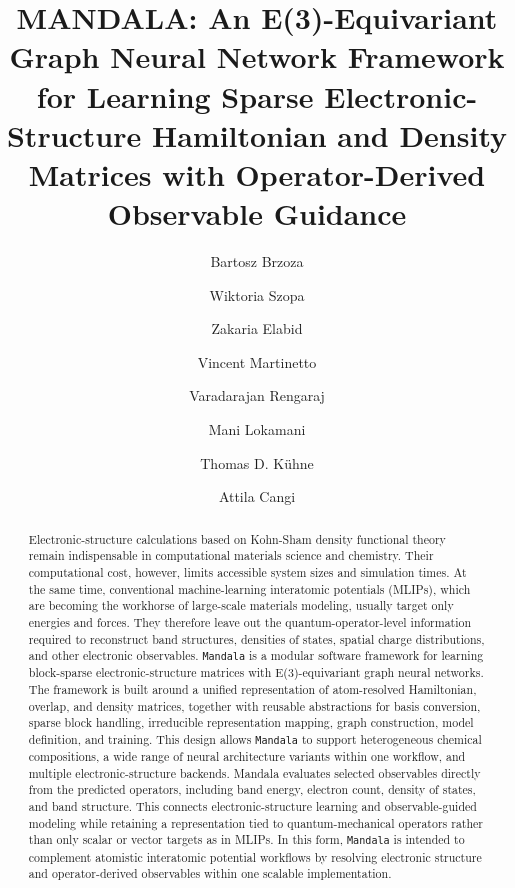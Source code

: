 \documentclass[preprint,12pt,compress,numafflabel]{elsarticle}
\begin{document}
\begin{frontmatter}

\title{MANDALA: An E(3)-Equivariant Graph Neural Network Framework for Learning Sparse Electronic-Structure Hamiltonian and Density Matrices with Operator-Derived Observable Guidance}

\author[casus,hzdr,uwr]{Bartosz Brzoza}
\author[casus,hzdr,wut]{Wiktoria Szopa}
\author[casus,hzdr]{Zakaria Elabid}
\author[casus,hzdr]{Vincent Martinetto}
\author[casus,hzdr]{Varadarajan Rengaraj}
\author[hzdr]{Mani Lokamani}
\author[casus,hzdr]{Thomas D. Kühne}
\author[casus,hzdr]{Attila Cangi}

\address[casus]{Center for Advanced Systems Understanding, 02826 Görlitz, Germany}
\address[hzdr]{Helmholtz-Zentrum Dresden-Rossendorf, 01328 Dresden, Germany}
\address[uwr]{Institute of Computer Science, University of Wroc\l aw, 50-300 Wroc\l aw, Poland}
\address[wut]{Faculty of Physics, Warsaw University of Technology, 00-662 Warsaw, Poland}

\begin{abstract}
Electronic-structure calculations based on Kohn-Sham density functional theory remain indispensable in computational materials science and chemistry. Their computational cost, however, limits accessible system sizes and simulation times.
At the same time, conventional machine-learning interatomic potentials (MLIPs), which are becoming the workhorse of large-scale materials modeling, usually target only energies and forces. They therefore leave out the quantum-operator-level information required to reconstruct band structures, densities of states, spatial charge distributions, and other electronic observables.
\texttt{Mandala} is a modular software framework for learning block-sparse electronic-structure matrices with E(3)-equivariant graph neural networks. The framework is built around a unified representation of atom-resolved Hamiltonian, overlap, and density matrices, together with reusable abstractions for basis conversion, sparse block handling, irreducible representation mapping, graph construction, model definition, and training. This design allows \texttt{Mandala} to support heterogeneous chemical compositions, a wide range of neural architecture variants within one workflow, and multiple electronic-structure backends.
Mandala evaluates selected observables directly from the predicted operators, including band energy, electron count, density of states, and band structure. This connects electronic-structure learning and observable-guided modeling while retaining a representation tied to quantum-mechanical operators rather than only scalar or vector targets as in MLIPs.
In this form, \texttt{Mandala} is intended to complement atomistic interatomic potential workflows by resolving electronic structure and operator-derived observables within one scalable implementation.


\end{abstract}
\end{frontmatter}
\end{document}
